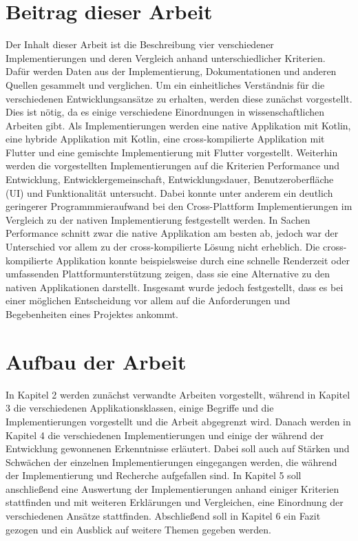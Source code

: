 \section{Beitrag dieser Arbeit}
Der Inhalt dieser Arbeit ist die Beschreibung vier verschiedener Implementierungen und deren Vergleich anhand unterschiedlicher Kriterien. Dafür werden Daten aus der Implementierung, Dokumentationen und anderen Quellen gesammelt und verglichen.
Um ein einheitliches Verständnis für die verschiedenen Entwicklungsansätze zu erhalten, werden diese zunächst vorgestellt. Dies ist nötig, da es einige verschiedene Einordnungen in wissenschaftlichen Arbeiten gibt.
Als Implementierungen werden eine native Applikation mit Kotlin, eine hybride Applikation mit Kotlin, eine cross-kompilierte Applikation mit Flutter und eine gemischte Implementierung mit Flutter vorgestellt. 
Weiterhin werden die vorgestellten Implementierungen auf die Kriterien Performance und Entwicklung, Entwicklergemeinschaft, Entwicklungsdauer, Benutzeroberfläche (UI) und Funktionalität untersucht.
Dabei konnte unter anderem ein deutlich geringerer Programmmieraufwand bei den Cross-Plattform Implementierungen im Vergleich zu der nativen Implementierung festgestellt werden. In Sachen Performance schnitt zwar die native Applikation am besten ab, jedoch war der Unterschied vor allem zu der cross-kompilierte Lösung nicht erheblich. Die cross-kompilierte Applikation konnte beispielsweise durch eine schnelle Renderzeit oder umfassenden Plattformunterstützung zeigen, dass sie eine Alternative zu den nativen Applikationen darstellt. Insgesamt wurde jedoch festgestellt, dass es bei einer möglichen Entscheidung vor allem auf die Anforderungen und Begebenheiten eines Projektes ankommt.

\section{Aufbau der Arbeit}
In Kapitel 2 werden zunächst verwandte Arbeiten vorgestellt, während in Kapitel 3 die verschiedenen Applikationsklassen, einige Begriffe und die Implementierungen vorgestellt und die Arbeit abgegrenzt wird.
Danach werden in Kapitel 4 die verschiedenen Implementierungen und einige der während der Entwicklung gewonnenen Erkenntnisse erläutert. Dabei soll auch auf Stärken und Schwächen der einzelnen Implementierungen eingegangen werden, die während der Implementierung und Recherche aufgefallen sind.
In Kapitel 5 soll anschließend eine Auswertung der Implementierungen anhand einiger Kriterien stattfinden und mit weiteren Erklärungen und Vergleichen, eine Einordnung der verschiedenen Ansätze stattfinden. Abschließend soll in Kapitel 6 ein Fazit gezogen und ein Ausblick auf weitere Themen gegeben werden.